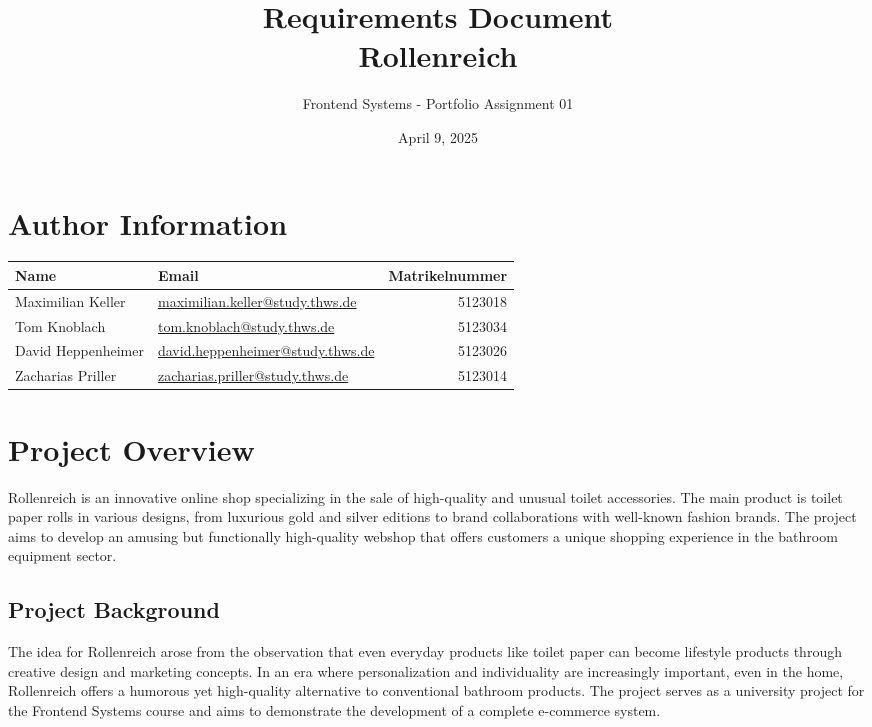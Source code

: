 \documentclass[a4paper,11pt]{article}
\title{\textbf{Requirements Document\\[0.5em]\Large Rollenreich}}
\author{Frontend Systems - Portfolio Assignment 01}
\date{April 9, 2025}
\begin{document}
\maketitle

\section*{Author Information}
\begin{tabularx}{\textwidth}{l X r}
\textbf{Name} & \textbf{Email} & \textbf{Matrikelnummer} \\
\hline
Maximilian Keller & \href{mailto:maximilian.keller@study.thws.de}{maximilian.keller@study.thws.de} & 5123018 \\
Tom Knoblach & \href{mailto:tom.knoblach@study.thws.de}{tom.knoblach@study.thws.de} & 5123034 \\
David Heppenheimer & \href{mailto:david.heppenheimer@study.thws.de}{david.heppenheimer@study.thws.de} & 5123026 \\
Zacharias Priller & \href{mailto:zacharias.priller@study.thws.de}{zacharias.priller@study.thws.de} & 5123014 \\
\end{tabularx}

\tableofcontents

\newpage

\section{Project Overview}
Rollenreich is an innovative online shop specializing in the sale of high-quality and unusual toilet accessories. The main product is toilet paper rolls in various designs, from luxurious gold and silver editions to brand collaborations with well-known fashion brands. The project aims to develop an amusing but functionally high-quality webshop that offers customers a unique shopping experience in the bathroom equipment sector.

\subsection{Project Background}
The idea for Rollenreich arose from the observation that even everyday products like toilet paper can become lifestyle products through creative design and marketing concepts. In an era where personalization and individuality are increasingly important, even in the home, Rollenreich offers a humorous yet high-quality alternative to conventional bathroom products. The project serves as a university project for the Frontend Systems course and aims to demonstrate the development of a complete e-commerce system.
\end{document}
